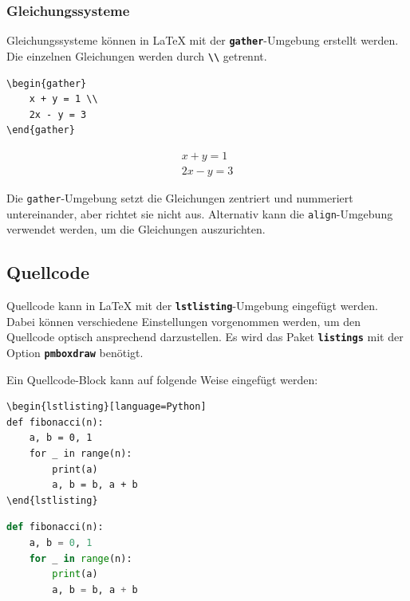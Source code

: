 \subsubsection{Gleichungssysteme}
Gleichungssysteme können in \LaTeX{} mit der \textbf{\texttt{gather}}-Umgebung erstellt werden. Die einzelnen Gleichungen werden durch \textbf{\texttt{\textbackslash\textbackslash}} getrennt.

\begin{minipage}{0.5\textwidth}
    \begin{lstlisting}[language={[LaTeX]TeX}]
\begin{gather}
    x + y = 1 \\
    2x - y = 3
\end{gather}
\end{lstlisting}
\end{minipage}
\hfill
\begin{minipage}{0.5\textwidth}
    \begin{gather}
        x + y = 1 \\
        2x - y = 3
    \end{gather}
\end{minipage}

Die \texttt{gather}-Umgebung setzt die Gleichungen zentriert und nummeriert untereinander, aber richtet sie nicht aus. Alternativ kann die \texttt{align}-Umgebung verwendet werden, um die Gleichungen auszurichten.


\subsection{Quellcode}
Quellcode kann in \LaTeX{} mit der \textbf{\texttt{lstlisting}}-Umgebung eingefügt werden. Dabei können verschiedene Einstellungen vorgenommen werden, um den Quellcode optisch ansprechend darzustellen. Es wird das Paket \textbf{\texttt{listings}} mit der Option \textbf{\texttt{pmboxdraw}} benötigt.

Ein Quellcode-Block kann auf folgende Weise eingefügt werden:

\begin{minipage}{0.48\textwidth}
    \begin{verbatim}
\begin{lstlisting}[language=Python]
def fibonacci(n):
    a, b = 0, 1
    for _ in range(n):
        print(a)
        a, b = b, a + b
\end{lstlisting}
\end{verbatim}
\end{minipage}
\hfill
\begin{minipage}{0.48\textwidth}
    \begin{lstlisting}[language=Python]
def fibonacci(n):
    a, b = 0, 1
    for _ in range(n):
        print(a)
        a, b = b, a + b
    \end{lstlisting}
\end{minipage}

